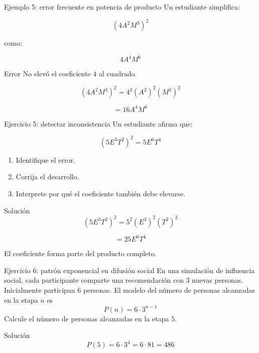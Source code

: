 \documentclass[aspectratio=169]{beamer}
\begin{document}
	\begin{frame}{Ejemplo 5: error frecuente en potencia de producto}
		Un estudiante simplifica:
		
		\[
		(4A^2M^3)^2
		\]
		
		como:
		
		\[
		4A^4M^6
		\]
		
		\begin{alertblock}{Error}
			No elevó el coeficiente \(4\) al cuadrado.
		\end{alertblock}
		
		\[
		(4A^2M^3)^2
		=
		4^2(A^2)^2(M^3)^2
		\]
		
		\[
		=16A^4M^6
		\]
	\end{frame}
	
	\begin{frame}{Ejercicio 5: detectar inconsistencia}
		Un estudiante afirma que:
		
		\[
		(5E^3T^2)^2=5E^6T^4
		\]
		
		\begin{enumerate}
			\item Identifique el error.
			\item Corrija el desarrollo.
			\item Interprete por qué el coeficiente también debe elevarse.
		\end{enumerate}
		
		\pause
		
		\begin{block}{Solución}
			\[
			(5E^3T^2)^2
			=
			5^2(E^3)^2(T^2)^2
			\]
			
			\[
			=25E^6T^4
			\]
			
			El coeficiente forma parte del producto completo.
		\end{block}
	\end{frame}
	
	\begin{frame}{Ejercicio 6: patrón exponencial en difusión social}
		En una simulación de influencia social, cada participante comparte una recomendación con \(3\) nuevas personas. Inicialmente participan \(6\) personas. El modelo del número de personas alcanzadas en la etapa $n$ es 
			\[
		P(n)=6\cdot 3^{n-1}
		\]
	Calcule el número de personas alcanzadas en la etapa \(5\).
					
		\pause
		
		\begin{block}{Solución}
			\[
			P(5)=6\cdot 3^4=6\cdot81=486
			\]
			
		\end{block}
	\end{frame}
	
\end{document}

